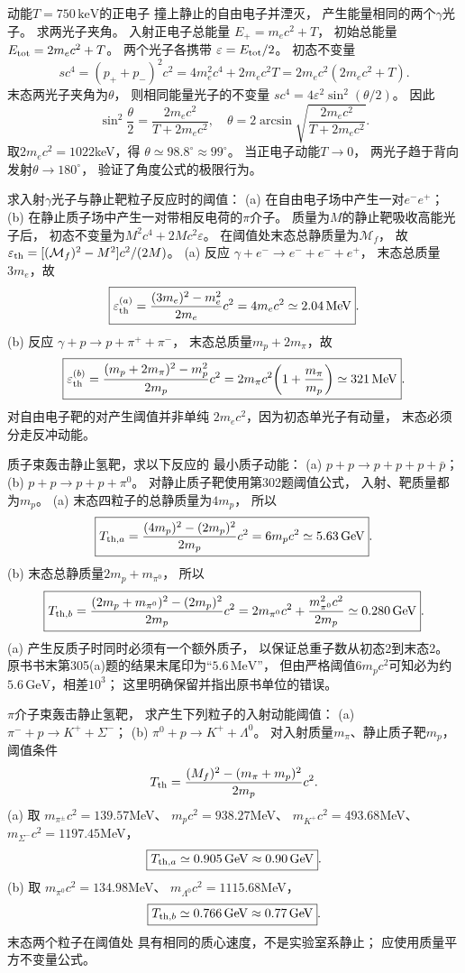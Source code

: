 动能$T=750\,\mathrm{keV}$的正电子
撞上静止的自由电子并湮灭，
产生能量相同的两个$\gamma$光子。
求两光子夹角。
\exsolution
入射正电子总能量
$E_+=m_ec^2+T$，
初始总能量$E_{\rm tot}=2m_ec^2+T$。
两个光子各携带
$\varepsilon=E_{\rm tot}/2$。
初态不变量
\[
 s c^4=(p_++p_-)^2c^2
 =4m_e^2c^4+2m_ec^2T
 =2m_ec^2(2m_ec^2+T).
\]
末态两光子夹角为$\theta$，
则相同能量光子的不变量
$s c^4=4\varepsilon^2\sin^2(\theta/2)$。
因此
\[
 \boxed{\sin^2\frac\theta2=
 \frac{2m_ec^2}{T+2m_ec^2}},\quad
 \boxed{\theta=
 2\arcsin\sqrt{\frac{2m_ec^2}{T+2m_ec^2}}}.
\]
取$2m_ec^2=1022$keV，得
$\boxed{\theta\simeq98.8^\circ\approx99^\circ}$。
\excheck 当正电子动能$T\to0$，
两光子趋于背向发射$\theta\to180^\circ$，
验证了角度公式的极限行为。

求入射$\gamma$光子与静止靶粒子反应时的阈值：
(a) 在自由电子场中产生一对$e^-e^+$；
(b) 在静止质子场中产生一对带相反电荷的$\pi$介子。
\exsolution
质量为$M$的静止靶吸收高能光子后，
初态不变量为$M^2c^4+2Mc^2\varepsilon$。
在阈值处末态总静质量为$\mathcal M_f$，
故
$\varepsilon_{\rm th}=
[(\mathcal M_f)^2-M^2]c^2/(2M)$。
(a) 反应
$\gamma+e^-\to e^-+e^-+e^+$，
末态总质量$3m_e$，故
\[
 \boxed{\varepsilon_{\rm th}^{(a)}
 =\frac{(3m_e)^2-m_e^2}{2m_e}c^2
 =4m_ec^2\simeq2.04\,\mathrm{MeV}}.
\]
(b) 反应
$\gamma+p\to p+\pi^++\pi^-$，
末态总质量$m_p+2m_\pi$，故
\[
 \boxed{\varepsilon_{\rm th}^{(b)}=
 \frac{(m_p+2m_\pi)^2-m_p^2}{2m_p}c^2
 =2m_\pi c^2\!\left(1+\frac{m_\pi}{m_p}\right)
 \simeq321\,\mathrm{MeV}}.
\]
\excheck 对自由电子靶的对产生阈值并非单纯
$2m_ec^2$，因为初态单光子有动量，
末态必须分走反冲动能。

质子束轰击静止氢靶，求以下反应的
最小质子动能：
(a) $p+p\to p+p+p+\bar p$；
(b) $p+p\to p+p+\pi^0$。
\exsolution
对静止质子靶使用第302题阈值公式，
入射、靶质量都为$m_p$。
(a) 末态四粒子的总静质量为$4m_p$，
所以
\[
 \boxed{T_{{\rm th},a}=
 \frac{(4m_p)^2-(2m_p)^2}{2m_p}c^2
 =6m_pc^2\simeq5.63\,\mathrm{GeV}}.
\]
(b) 末态总静质量$2m_p+m_{\pi^0}$，
所以
\[
 \boxed{T_{{\rm th},b}=
 \frac{(2m_p+m_{\pi^0})^2-(2m_p)^2}{2m_p}c^2
 =2m_{\pi^0}c^2+\frac{m_{\pi^0}^2c^2}{2m_p}
 \simeq0.280\,\mathrm{GeV}}.
\]
\excheck (a) 产生反质子时同时必须有一个额外质子，
以保证总重子数从初态2到末态2。
原书书末第305(a)题的结果末尾印为“$5.6\,\mathrm{MeV}$”，
但由严格阈值$6m_pc^2$可知必为约
$5.6\,\mathrm{GeV}$，相差$10^3$；
这里明确保留并指出原书单位的错误。

$\pi$介子束轰击静止氢靶，
求产生下列粒子的入射动能阈值：
(a) $\pi^-+p\to K^++\Sigma^-$；
(b) $\pi^0+p\to K^++\Lambda^0$。
\exsolution
对入射质量$m_\pi$、静止质子靶$m_p$，
阈值条件
\[
 T_{\rm th}=
 \frac{(M_f)^2-(m_\pi+m_p)^2}{2m_p}c^2.
\]
(a) 取
$m_{\pi^\pm}c^2=139.57$MeV、
$m_pc^2=938.27$MeV、
$m_{K^+}c^2=493.68$MeV、
$m_{\Sigma^-}c^2=1197.45$MeV，
\[
 \boxed{T_{{\rm th},a}\simeq0.905\,\mathrm{GeV}
 \approx0.90\,\mathrm{GeV}}.
\]
(b) 取
$m_{\pi^0}c^2=134.98$MeV、
$m_{\Lambda^0}c^2=1115.68$MeV，
\[
 \boxed{T_{{\rm th},b}\simeq0.766\,\mathrm{GeV}
 \approx0.77\,\mathrm{GeV}}.
\]
\excheck 末态两个粒子在阈值处
具有相同的质心速度，不是实验室系静止；
应使用质量平方不变量公式。

